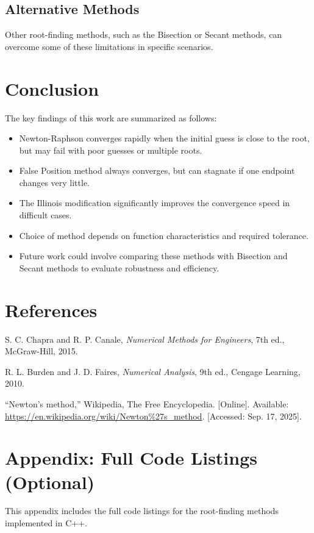 \documentclass[12pt,a4paper]{article}
\begin{document}
\subsection{Alternative Methods}
Other root-finding methods, such as the Bisection or Secant methods, can overcome some of these limitations in specific scenarios.


\section{Conclusion}
The key findings of this work are summarized as follows:

\begin{itemize}
    \item Newton-Raphson converges rapidly when the initial guess is close to the root, but may fail with poor guesses or multiple roots.
    \item False Position method always converges, but can stagnate if one endpoint changes very little.
    \item The Illinois modification significantly improves the convergence speed in difficult cases.
    \item Choice of method depends on function characteristics and required tolerance.
    \item Future work could involve comparing these methods with Bisection and Secant methods to evaluate robustness and efficiency.
\end{itemize}


\section{References}
\begin{thebibliography}{9}

S. C. Chapra and R. P. Canale, \textit{Numerical Methods for Engineers}, 7th ed., McGraw-Hill, 2015.

R. L. Burden and J. D. Faires, \textit{Numerical Analysis}, 9th ed., Cengage Learning, 2010.

``Newton's method,'' Wikipedia, The Free Encyclopedia. [Online]. Available: \url{https://en.wikipedia.org/wiki/Newton%27s_method}. [Accessed: Sep. 17, 2025].

\end{thebibliography}

\appendix
\section{Appendix: Full Code Listings (Optional)}
This appendix includes the full code listings for the root-finding methods implemented in C++.
\end{document}
